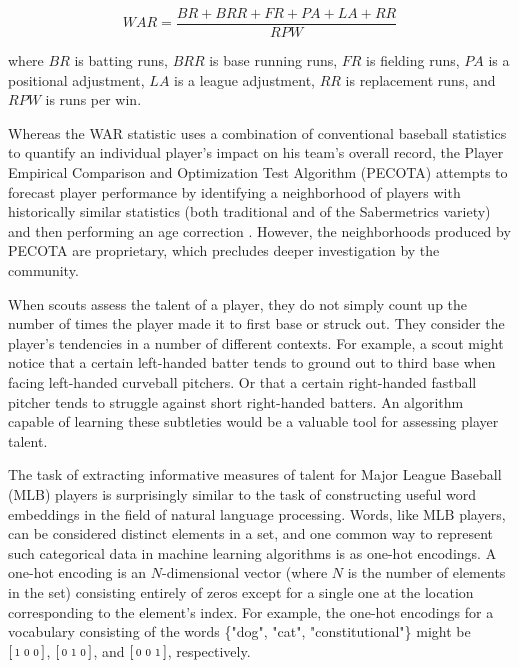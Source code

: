 \documentclass{article}
\begin{document}
\begin{equation}
\label{eqn:war}
WAR = \frac{BR + BRR + FR + PA + LA + RR}{RPW}
\end{equation}

where $BR$ is batting runs, $BRR$ is base running runs, $FR$ is fielding runs, $PA$ is a positional adjustment, $LA$ is a league adjustment, $RR$ is replacement runs, and $RPW$ is runs per win.

Whereas the WAR statistic uses a combination of conventional baseball statistics to quantify an individual player's impact on his team's overall record, the Player Empirical Comparison and Optimization Test Algorithm (PECOTA) attempts to forecast player performance by identifying a neighborhood of players with historically similar statistics (both traditional and of the Sabermetrics variety) and then performing an age correction \parencite{PECOTA}. However, the neighborhoods produced by PECOTA are proprietary, which precludes deeper investigation by the community.

When scouts assess the talent of a player, they do not simply count up the number of times the player made it to first base or struck out. They consider the player's tendencies in a number of different contexts. For example, a scout might notice that a certain left-handed batter tends to ground out to third base when facing left-handed curveball pitchers. Or that a certain right-handed fastball pitcher tends to struggle against short right-handed batters. An algorithm capable of learning these subtleties would be a valuable tool for assessing player talent.

The task of extracting informative measures of talent for Major League Baseball (MLB) players is surprisingly similar to the task of constructing useful word embeddings in the field of natural language processing. Words, like MLB players, can be considered distinct elements in a set, and one common way to represent such categorical data in machine learning algorithms is as one-hot encodings. A one-hot encoding is an $N$-dimensional vector (where $N$ is the number of elements in the set) consisting entirely of zeros except for a single one at the location corresponding to the element's index. For example, the one-hot encodings for a vocabulary consisting of the words \{"dog", "cat", "constitutional"\} might be $\begin{bsmallmatrix} 1 & 0 & 0 \end{bsmallmatrix}$, $\begin{bsmallmatrix} 0 & 1 & 0 \end{bsmallmatrix}$, and $\begin{bsmallmatrix} 0 & 0 & 1 \end{bsmallmatrix}$, respectively.
\end{document}
